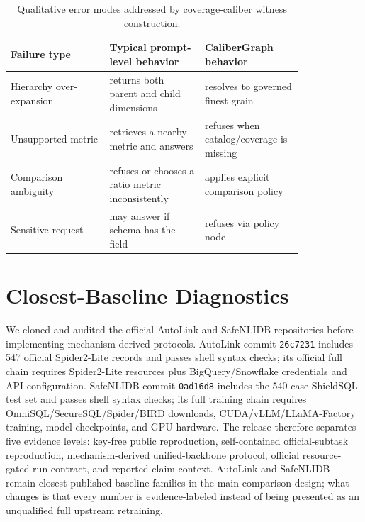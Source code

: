 \documentclass[letterpaper]{article}
\begin{document}
\begin{table}[h]
\centering
\scriptsize
\begin{tabular}{@{}>{\raggedright\arraybackslash}p{0.28\linewidth}>{\raggedright\arraybackslash}p{0.27\linewidth}>{\raggedright\arraybackslash}p{0.27\linewidth}@{}}
\toprule
Failure type & Typical prompt-level behavior & CaliberGraph behavior \\
\midrule
Hierarchy over-expansion & returns both parent and child dimensions & resolves to governed finest grain \\
Unsupported metric & retrieves a nearby metric and answers & refuses when catalog/coverage is missing \\
Comparison ambiguity & refuses or chooses a ratio metric inconsistently & applies explicit comparison policy \\
Sensitive request & may answer if schema has the field & refuses via policy node \\
\bottomrule
\end{tabular}
\caption{Qualitative error modes addressed by coverage-caliber witness construction.}
\end{table}

\section{Closest-Baseline Diagnostics}

We cloned and audited the official AutoLink and SafeNLIDB repositories before implementing mechanism-derived protocols. AutoLink commit \texttt{26c7231} includes 547 official Spider2-Lite records and passes shell syntax checks; its official full chain requires Spider2-Lite resources plus BigQuery/Snowflake credentials and API configuration. SafeNLIDB commit \texttt{0ad16d8} includes the 540-case ShieldSQL test set and passes shell syntax checks; its full training chain requires OmniSQL/SecureSQL/Spider/BIRD downloads, CUDA/vLLM/LLaMA-Factory training, model checkpoints, and GPU hardware. The release therefore separates five evidence levels: key-free public reproduction, self-contained official-subtask reproduction, mechanism-derived unified-backbone protocol, official resource-gated run contract, and reported-claim context. AutoLink and SafeNLIDB remain closest published baseline families in the main comparison design; what changes is that every number is evidence-labeled instead of being presented as an unqualified full upstream retraining.
\end{document}
